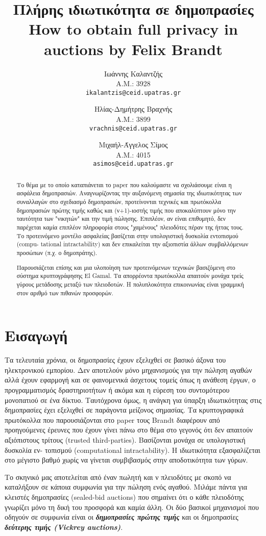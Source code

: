 \documentclass[letterpaper,11pt]{article}
\title{
	Πλήρης ιδιωτικότητα σε δημοπρασίες \\
	\vspace{3mm}
	\normalsize{\textbf{How to obtain full privacy in auctions} by \textbf{Felix Brandt}} \\
}
\author{
	Ιωάννης Καλαντζής\\
	Α.Μ.: 3928\\
	\texttt{ikalantzis@ceid.upatras.gr}
\and
	Ηλίας-Δημήτρης Βραχνής\\
	Α.Μ.: 3899\\
	\texttt{vrachnis@ceid.upatras.gr}
\and
	Μιχαήλ-Άγγελος Σίμος\\
	Α.Μ.: 4015\\
	\texttt{asimos@ceid.upatras.gr}
}
\date{}
\begin{document}
\maketitle

\begin{abstract} Το θέμα με το οποίο καταπιάνεται το paper που καλούμαστε να σχολιάσουμε είναι η ασφάλεια δημοπρασιών. Αναγνωρίζοντας την
αυξανόμενη σημασία της ιδιωτικότητας των συναλλαγών στο σχεδιασμό δημοπρασιών, προτείνονται τεχνικές και πρωτόκολλα δημοπρασιών πρώτης τιμής καθώς
και (ν+1)-ιοστής τιμής που αποκαλύπτουν μόνο την ταυτότητα των "νικητών" και την τιμή πώλησης. Επιπλέον, αν είναι επιθυμητό, δεν παρέχεται καμία
επιπλέον πληροφορία στους "χαμένους" πλειοδότες πέραν της ήττας τους. Το προτεινόμενο μοντέλο ασφαλείας βασίζεται στην υπολογιστική δυσκολία
εντοπισμού (compu- tational intractability) και δεν επικαλείται την αξιοπιστία άλλων συμβαλλόμενων προσώπων (π.χ. ο δημοπράτης).

Παρουσιάζεται επίσης και μια υλοποίηση των προτεινόμενων τεχνικών βασιζόμενη στο σύστημα κρυπτογράφησης El Gamal. Τα απορρέοντα πρωτόκολλα απαιτούν
μονάχα τρείς γύρους μετάδοσης μεταξύ των πλειοδοτών. Η πολυπλοκότητα επικοινωνίας είναι γραμμική στον αριθμό των πιθανών προσφορών. 
\end{abstract}

\section{Εισαγωγή} Τα τελευταία χρόνια, οι δημοπρασίες έχουν εξελιχθεί σε βασικό άξονα του ηλεκτρονικού
εμπορίου. Δεν αποτελούν μόνο μηχανισμούς για την πώληση αγαθών αλλά έχουν εφαρμογή και σε φαινομενικά άσχετους
τομείς όπως η ανάθεση έργων, ο προγραμματισμός δραστηριοτήτων ή ακόμα και η εύρεση του συντομότερου μονοπατιού
σε ένα δίκτυο. Ταυτόχρονα όμως, η ανάγκη για ύπαρξη ιδιωτικότητας στις δημοπρασίες έχει εξελιχθεί σε παράγοντα
μείζονος σημασίας. Τα κρυπτογραφικά πρωτόκολλα που παρουσιάζονται στο paper τους Brandt διαφέρουν από
προηγούμενες έρευνες που έχουν γίνει πάνω στο θέμα στο γεγονός ότι δεν απαιτούν αξιόπιστους τρίτους (trusted
third-parties). Βασίζονται μονάχα σε υπολογιστική δυσκολία εν- τοπισμού (computational intractability). Η
ιδιωτικότητα εξασφαλίζεται στο μέγιστο βαθμό χωρίς να γίνεται συμβιβασμός στην αποδοτικότητα των γύρων.

Το σκηνικό μας αποτελείται από έναν πωλητή και ν πλειοδότες με σκοπό να καταλήξουν σε κάποια συμφωνία για την
πώληση ενός αγαθού. Μιλάμε πάντα για κλειστές δημοπρασίες (sealed-bid auctions) που σημαίνει ότι ο κάθε
πλειοδότης γνωρίζει μόνο τη δική του προσφορά και καμία άλλη. Οι δύο βασικοί μηχανισμοί που οδηγούν σε
συμφωνία είναι οι \textbf{\emph{δημοπρασίες πρώτης τιμής}} και οι δημοπρασίες \textbf{\emph{δεύτερης τιμής
(Vickrey auctions\cite{Vickrey})}}.
\end{document}
